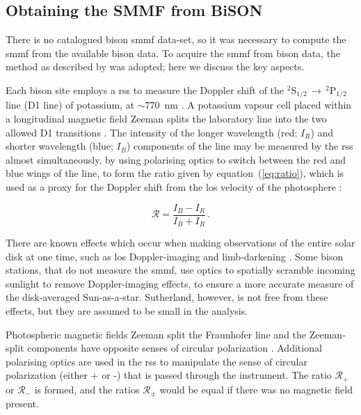 \subsection{Obtaining the SMMF from BiSON}

There is no catalogued \gls{bison} \gls{smmf} data-set, so it was necessary to compute the \gls{smmf} from the available \gls{bison} data. To acquire the \gls{smmf} from \gls{bison} data, the method as described by \citet{chaplin_studies_2003} was adopted; here we discuss the key aspects.

Each  \gls{bison} site employs a \gls{rss} to measure the Doppler shift of the $^{2}\mathrm{S}_{1/2} \, \rightarrow \, ^{2}\mathrm{P}_{1/2}$ line (D1 line) of potassium, at $\sim 770$~nm \citep{brookes_resonant-scattering_1978}. A potassium vapour cell placed within a longitudinal magnetic field Zeeman splits the laboratory line into the two allowed D1 transitions \citep{lund_spatial_2017}. The intensity of the longer wavelength (red; $I_R$) and shorter wavelength (blue; $I_B$) components of the line may be measured by the \gls{rss} almost simultaneously, by using polarising optics to switch between the red and blue wings of the line, to form the ratio given by equation~(\ref{eq:ratio}), which is used as a proxy for the Doppler shift from the \gls{los} velocity of the photosphere \citep[see:][]{brookes_observation_1976, brookes_resonant-scattering_1978, elsworth_performance_1995, chaplin_studies_2003, lund_spatial_2017}: 

\begin{equation}
\mathcal{R} = \frac{I_B - I_R}{I_B + I_R} \, .
\label{eq:ratio}
\end{equation}

There are known effects which occur when making observations of the entire solar disk at one time, such as \gls{los} Doppler-imaging and limb-darkening \citep{davies_bison_2014}. Some \gls{bison} stations, that do not measure the \gls{smmf}, use optics to spatially scramble incoming sunlight to remove Doppler-imaging effects, to ensure a more accurate measure of the disk-averaged Sun-as-a-star. Sutherland, however, is not free from these effects, but they are assumed to be small in the analysis.

Photospheric magnetic fields Zeeman split the Fraunhofer line and the Zeeman-split components have opposite senses of circular polarization \citep{chaplin_studies_2003}. Additional polarising optics are used in the \gls{rss} to manipulate the sense of circular polarization (either + or -) that is passed through the instrument. The ratio $\mathcal{R}_{+}$ or $\mathcal{R}_{-}$ is formed, and the ratios $\mathcal{R}_{\pm}$ would be equal if there was no magnetic field present.

